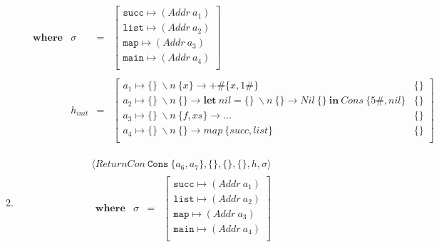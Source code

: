 \documentclass{article}
\begin{document}
\begin{enumerate}
\begin{enumerate}
\begin{align*}
          & \begin{array}{llcl}
            \mathbf{where} & \sigma & = &
              \left[ \begin{array}{l}
                \mathtt{succ} \mapsto (\mathit{Addr}~a_1) \\
                \mathtt{list} \mapsto (\mathit{Addr}~a_2) \\
                \mathtt{map} \mapsto (\mathit{Addr}~a_3) \\
                \mathtt{main} \mapsto (\mathit{Addr}~a_4) \\
              \end{array} \right] \\
            \\
            & h_{\mathit{init}} & = &
              \left[ \begin{array}{ll}
                  a_1 \mapsto \{\}~\backslash n~\{x\} \to +\#\{x, 1\#\} & \{\} \\
                a_2 \mapsto \{\}~\backslash n~\{\} \to \mathbf{let}~\mathit{nil} = \{\}~\backslash n~\{\} \to \mathit{Nil}~\{\}~\mathbf{in}~\mathit{Cons}~\{5\#, \mathit{nil}\} & \{\} \\
                a_3 \mapsto \{\}~\backslash n~\{f,xs\} \to \ldots & \{\} \\
                a_4 \mapsto \{\}~\backslash n~\{\} \to \mathit{map}~\{\mathit{succ}, \mathit{list}\} & \{\} \\
              \end{array} \right]
            \end{array}
        \end{align*}
      \item
        \begin{align*}
          & \langle \mathit{ReturnCon}~\mathtt{Cons}~\{a_6,a_{7}\},\{\},\{\},\{\}, h, \sigma \rangle \\
          & \begin{array}{llcl}
            \mathbf{where} & \sigma & = &
              \left[ \begin{array}{l}
                \mathtt{succ} \mapsto (\mathit{Addr}~a_1) \\
                \mathtt{list} \mapsto (\mathit{Addr}~a_2) \\
                \mathtt{map} \mapsto (\mathit{Addr}~a_3) \\
                \mathtt{main} \mapsto (\mathit{Addr}~a_4) \\
              \end{array} \right] \\

\end{array}
\end{align*}
\end{enumerate}
\end{enumerate}
\end{document}
